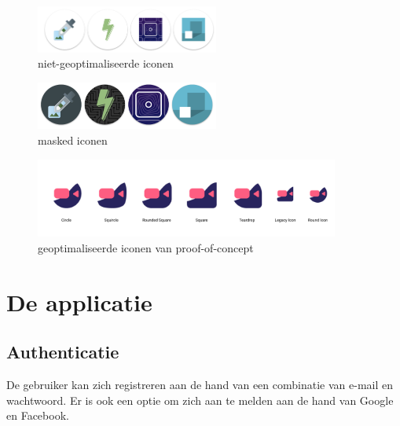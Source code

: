 		\begin{figure}[H]
			\centering
			\includegraphics[width=60mm]{./img/traditionalIcons}{}
			\caption{niet-geoptimaliseerde iconen \autocite{Oakes2019}}
			\label{fig:unmasked}
		\end{figure}
		\begin{figure}[H]
			\centering
			\includegraphics[width=60mm]{./img/maskedicons}{}
			\caption{masked iconen  \autocite{Oakes2019}}
			\label{fig:masked}
		\end{figure}
		\begin{figure}[H]
			\centering
			\includegraphics[width=100mm]{./img/iconPWA.png}{}
			\caption{geoptimaliseerde iconen van proof-of-concept}
			\label{fig:videocallMasked}
		\end{figure}

\newpage
\section{De applicatie}
	\subsection{Authenticatie}
		De gebruiker kan zich registreren aan de hand van een combinatie van e-mail en wachtwoord. Er is ook een optie om zich aan te melden aan de hand van Google en Facebook.
		

